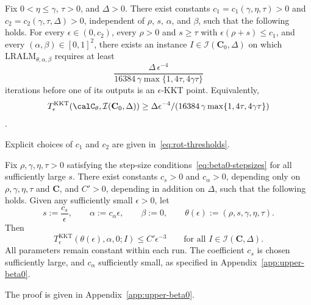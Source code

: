 \begin{theorem}
\label{thm:lower-bound}
Fix \(0<\eta\le\gamma\), \(\tau>0\), and \(\Delta>0\). There exist constants
\(c_1=c_1(\gamma,\eta,\tau)>0\) and \(c_2=c_2(\gamma,\tau,\Delta)>0\),
independent of \(\rho\), \(s\), \(\alpha\), and \(\beta\), such that the
following holds. For every \(\epsilon\in(0,c_2)\), every \(\rho>0\) and
\(s\ge\tau\) with \(\epsilon(\rho+s)\le c_1\), and every
\((\alpha,\beta)\in[0,1]^2\), there exists an instance
\(I\in\mathcal I(\mathbf C_0,\Delta)\) on which
\(\mathrm{LRALM}_{\theta,\alpha,\beta}\) requires at least
\[
    \frac{\Delta\,\epsilon^{-4}}{16384\,\gamma\max\{1,4\tau,4\gamma\tau\}}
\]
iterations before one of its outputs is an \(\epsilon\)-KKT point.
Equivalently, 
\[T^{\mathrm{KKT}}_\epsilon(\calC_\theta,\mathcal I(\mathbf C_0,\Delta))
\ge\Delta\epsilon^{-4}/(16384\,\gamma\max\{1,4\tau,4\gamma\tau\})\].
\end{theorem}
Explicit choices of \(c_1\) and \(c_2\) are given in~\eqref{eq:rot-thresholds}.

\begin{theorem}[Iteration complexity of LRALM with \(\beta=0\)]
\label{thm:upper-beta0}
Fix \(\rho,\gamma,\eta,\tau>0\) satisfying the step-size
conditions~\eqref{eq:beta0-stepsizes} for all sufficiently large \(s\).
There exist constants \(c_s>0\) and \(c_\alpha>0\), depending only on
\(\rho,\gamma,\eta,\tau\) and \(\mathbf C\), and \(C'>0\), depending in
addition on \(\Delta\), such that the following holds. Given any
sufficiently small \(\epsilon>0\), let
\[
s:=\frac{c_s}{\epsilon},\qquad
\alpha:=c_\alpha\epsilon,\qquad \beta:=0,\qquad
\theta(\epsilon):=(\rho,s,\gamma,\eta,\tau).
\]
Then
\[
T^{\mathrm{KKT}}_\epsilon(\theta(\epsilon),\alpha,0;I)
\le C'\epsilon^{-3}
\qquad\text{for all }I\in\mathcal I(\mathbf C,\Delta).
\]
All parameters remain constant within each run. The coefficient \(c_s\)
is chosen sufficiently large, and \(c_\alpha\) sufficiently small, as
specified in Appendix~\ref{app:upper-beta0}.
\end{theorem}
The proof is given in Appendix~\ref{app:upper-beta0}.

